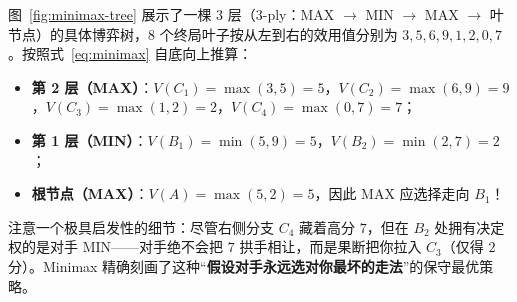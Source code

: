 图~\ref{fig:minimax-tree} 展示了一棵 3 层（3-ply：MAX $\to$ MIN $\to$ MAX $\to$ 叶节点）的具体博弈树，8 个终局叶子按从左到右的效用值分别为 $3, 5, 6, 9, 1, 2, 0, 7$。按照式~\eqref{eq:minimax} 自底向上推算：
\begin{itemize}
  \item \textbf{第 2 层（MAX）}：$V(C_1) = \max(3, 5) = 5$，$V(C_2) = \max(6, 9) = 9$，$V(C_3) = \max(1, 2) = 2$，$V(C_4) = \max(0, 7) = 7$；
  \item \textbf{第 1 层（MIN）}：$V(B_1) = \min(5, 9) = 5$，$V(B_2) = \min(2, 7) = 2$；
  \item \textbf{根节点（MAX）}：$V(A) = \max(5, 2) = 5$，因此 \textsf{MAX} 应选择走向 $B_1$！
\end{itemize}
注意一个极具启发性的细节：尽管右侧分支 $C_4$ 藏着高分 $7$，但在 $B_2$ 处拥有决定权的是对手 \textsf{MIN}——对手绝不会把 $7$ 拱手相让，而是果断把你拉入 $C_3$（仅得 $2$ 分）。Minimax 精确刻画了这种“\textbf{假设对手永远选对你最坏的走法}”的保守最优策略。

